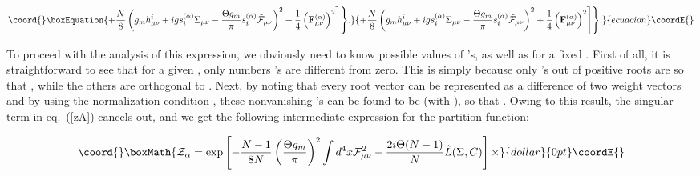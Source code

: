 \documentclass[a4paper,12pt]{article}
\begin{document}
\begin{equation}\coord{}\boxEquation{
\label{zA}
+\frac{N}{8}\left(
g_mh_{\mu\nu}^i+igs_i^{(\alpha)}
\Sigma_{\mu\nu}-\frac{\Theta g_m}{\pi} s_i^{(\alpha)}
\tilde{\cal F}_{\mu\nu}\right)^2
+\frac14\left({\bf F}_{\mu\nu}^{(\alpha)}
\right)^2\Biggr]\Biggr\}.
}{
+\frac{N}{8}\left(
g_mh_{\mu\nu}^i+igs_i^{(\alpha)}
\Sigma_{\mu\nu}-\frac{\Theta g_m}{\pi} s_i^{(\alpha)}
\tilde{\cal F}_{\mu\nu}\right)^2
+\frac14\left({\bf F}_{\mu\nu}^{(\alpha)}
\right)^2\Biggr]\Biggr\}.
}{ecuacion}\coordE{}\end{equation}

To proceed with the analysis of this expression, we obviously need to know possible values of \coordHE{}'s,
as well as \coordHE{} for a fixed \myHighlight{$\alpha$}\coordHE{}. First of all,
it is straightforward to see that
for a given \myHighlight{$\alpha$}\coordHE{}, only \coordHE{} numbers \coordHE{}'s are different from zero.
This is simply because
only \coordHE{}  \coordHE{}'s out of \coordHE{} positive roots are so that \coordHE{},
while the others are orthogonal to \coordHE{}.
Next, by noting that every root vector can be represented as a difference of two weight vectors and by using the
normalization condition \coordHE{}, these nonvanishing \coordHE{}'s can be found
to be \coordHE{} (with \coordHE{}),
so that \coordHE{}. Owing to this result, the singular term
\coordHE{} in eq.~(\ref{zA}) cancels out, and we get the following intermediate expression
for the partition function:

$$\coord{}\boxMath{
{\cal Z}_\alpha=\exp\left[-\frac{N-1}{8N}\left(\frac{\Theta g_m}{\pi}\right)^2\int d^4x
{\cal F}_{\mu\nu}^2
-\frac{2i\Theta(N-1)}{N}\hat L(\Sigma, C)\right]\times}{dollar}{0pt}\coordE{}$$
\end{document}
